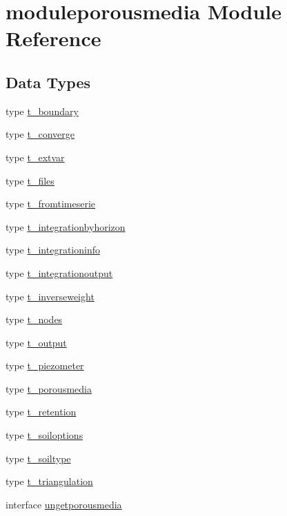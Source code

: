 \hypertarget{namespacemoduleporousmedia}{}\section{moduleporousmedia Module Reference}
\label{namespacemoduleporousmedia}
\subsection*{Data Types}
\begin{DoxyCompactItemize}
\item 
type \mbox{\hyperlink{structmoduleporousmedia_1_1t__boundary}{t\+\_\+boundary}}
\item 
type \mbox{\hyperlink{structmoduleporousmedia_1_1t__converge}{t\+\_\+converge}}
\item 
type \mbox{\hyperlink{structmoduleporousmedia_1_1t__extvar}{t\+\_\+extvar}}
\item 
type \mbox{\hyperlink{structmoduleporousmedia_1_1t__files}{t\+\_\+files}}
\item 
type \mbox{\hyperlink{structmoduleporousmedia_1_1t__fromtimeserie}{t\+\_\+fromtimeserie}}
\item 
type \mbox{\hyperlink{structmoduleporousmedia_1_1t__integrationbyhorizon}{t\+\_\+integrationbyhorizon}}
\item 
type \mbox{\hyperlink{structmoduleporousmedia_1_1t__integrationinfo}{t\+\_\+integrationinfo}}
\item 
type \mbox{\hyperlink{structmoduleporousmedia_1_1t__integrationoutput}{t\+\_\+integrationoutput}}
\item 
type \mbox{\hyperlink{structmoduleporousmedia_1_1t__inverseweight}{t\+\_\+inverseweight}}
\item 
type \mbox{\hyperlink{structmoduleporousmedia_1_1t__nodes}{t\+\_\+nodes}}
\item 
type \mbox{\hyperlink{structmoduleporousmedia_1_1t__output}{t\+\_\+output}}
\item 
type \mbox{\hyperlink{structmoduleporousmedia_1_1t__piezometer}{t\+\_\+piezometer}}
\item 
type \mbox{\hyperlink{structmoduleporousmedia_1_1t__porousmedia}{t\+\_\+porousmedia}}
\item 
type \mbox{\hyperlink{structmoduleporousmedia_1_1t__retention}{t\+\_\+retention}}
\item 
type \mbox{\hyperlink{structmoduleporousmedia_1_1t__soiloptions}{t\+\_\+soiloptions}}
\item 
type \mbox{\hyperlink{structmoduleporousmedia_1_1t__soiltype}{t\+\_\+soiltype}}
\item 
type \mbox{\hyperlink{structmoduleporousmedia_1_1t__triangulation}{t\+\_\+triangulation}}
\item 
interface \mbox{\hyperlink{interfacemoduleporousmedia_1_1ungetporousmedia}{ungetporousmedia}}
\end{DoxyCompactItemize}
